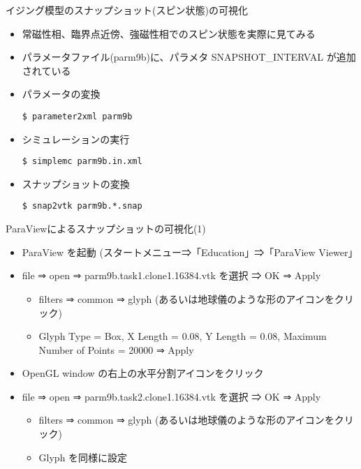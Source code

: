 \begin{frame}[t,fragile]{イジング模型のスナップショット(スピン状態)の可視化}
  \begin{itemize}
  \item 常磁性相、臨界点近傍、強磁性相でのスピン状態を実際に見てみる
  \item パラメータファイル(parm9b)に、パラメタ SNAPSHOT\_INTERVAL が追加されている
  \item パラメータの変換
\begin{lstlisting}
$ parameter2xml parm9b
\end{lstlisting}
  \item シミュレーションの実行
\begin{lstlisting}
$ simplemc parm9b.in.xml
\end{lstlisting}
\item スナップショットの変換
\begin{lstlisting}
$ snap2vtk parm9b.*.snap
\end{lstlisting}
  \end{itemize}
\end{frame}

\begin{frame}[t,fragile]{ParaViewによるスナップショットの可視化(1)}
  \begin{itemize}
  \item ParaView を起動 (スタートメニュー⇒「Education」⇒「ParaView Viewer」
  \item file ⇒ open ⇒ parm9b.task1.clone1.16384.vtk を選択 ⇒ OK ⇒ Apply
    \begin{itemize}
    \item filters ⇒ common ⇒ glyph (あるいは地球儀のような形のアイコンをクリック)
    \item Glyph Type = Box, X Length = 0.08, Y Length = 0.08, Maximum Number of Points = 20000 ⇒ Apply
    \end{itemize}
  \item OpenGL window の右上の水平分割アイコンをクリック
  \item file ⇒ open ⇒ parm9b.task2.clone1.16384.vtk を選択 ⇒ OK ⇒ Apply
    \begin{itemize}
    \item filters ⇒ common ⇒ glyph (あるいは地球儀のような形のアイコンをクリック)
    \item Glyph を同様に設定
    \end{itemize}
  \end{itemize}
\end{frame}

